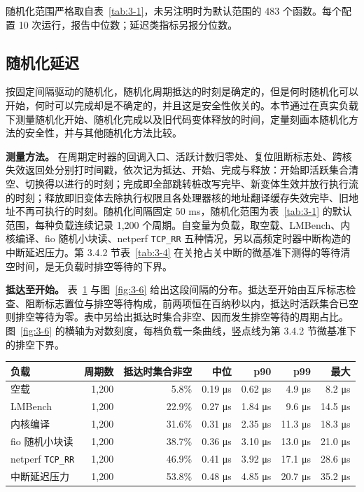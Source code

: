随机化范围严格取自表~\ref{tab:3-1}，未另注明时为默认范围的 483 个函数。每个配置 10 次运行，报告中位数；延迟类指标另报分位数。

\subsection{随机化延迟}

按固定间隔驱动的随机化，随机化周期抵达的时刻是确定的，但是何时随机化可以开始，何时可以完成却是不确定的，并且这是安全性攸关的。本节通过在真实负载下测量随机化开始、随机化完成以及旧代码变体释放的时间，定量刻画本随机化方法的安全性，并与其他随机化方法比较。

\textbf{测量方法。} 在周期定时器的回调入口、活跃计数归零处、复位阻断标志处、跨核失效返回处分别打时间戳，依次记为抵达、开始、完成与释放：开始即活跃集合清空、切换得以进行的时刻；完成即全部跳转桩改写完毕、新变体生效并放行执行流的时刻；释放即旧变体去除执行权限且各处理器核的地址翻译缓存失效完毕、旧地址不再可执行的时刻。随机化间隔固定 50 ms，随机化范围为表~\ref{tab:3-1} 的默认范围，每种负载连续记录 1,200 个周期。自变量为负载，取空载、LMBench、内核编译、fio 随机小块读、netperf \lstinline[breaklines=false]@TCP_RR@ 五种情况，另以高频定时器中断构造的中断延迟压力。第 3.4.2 节表~\ref{tab:3-4} 在关抢占关中断的微基准下测得的等待清空时间，是无负载时排空等待的下界。

\textbf{抵达至开始。} 表~\ref{tab:3-7} 与图~\ref{fig:3-6} 给出这段间隔的分布。抵达至开始由互斥标志检查、阻断标志置位与排空等待构成，前两项恒在百纳秒以内，抵达时活跃集合已空则排空等待为零。表中另给出抵达时集合非空、因而发生排空等待的周期占比。图~\ref{fig:3-6} 的横轴为对数刻度，每档负载一条曲线，竖点线为第 3.4.2 节微基准下的排空下界。

\begin{table}[!htbp]
    \label{tab:3-7}
    \centering
    \scriptsize
    \setlength{\tabcolsep}{3pt}
    \renewcommand{\arraystretch}{1.25}
    \begin{tabular}{lrrrrrr}
        \hline
        负载 & 周期数 & 抵达时集合非空 & 中位 & p90 & p99 & 最大\\
        \hline
        空载 & 1,200 & 5.8\% & 0.19 μs & 0.62 μs & 4.9 μs & 8.2 μs\\
        LMBench & 1,200 & 22.9\% & 0.27 μs & 1.84 μs & 9.6 μs & 14.5 μs\\
        内核编译 & 1,200 & 31.6\% & 0.31 μs & 2.35 μs & 11.3 μs & 18.3 μs\\
        fio 随机小块读 & 1,200 & 38.7\% & 0.36 μs & 3.10 μs & 13.0 μs & 21.0 μs\\
        netperf \lstinline[breaklines=false]@TCP_RR@ & 1,200 & 46.9\% & 0.41 μs & 3.92 μs & 17.1 μs & 28.6 μs\\
        中断延迟压力 & 1,200 & 53.8\% & 0.48 μs & 4.85 μs & 20.7 μs & 35.2 μs\\
        \hline
    \end{tabular}
\end{table}

